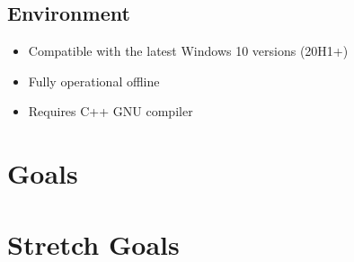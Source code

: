 \documentclass{article}
\begin{document}
\subsection{Environment}
\begin{itemize}
  \item Compatible with the latest Windows 10 versions (20H1+)
  \item Fully operational offline 
  \item Requires C++ GNU compiler 
\end{itemize}

\section{Goals}

\section{Stretch Goals}
\end{document}
